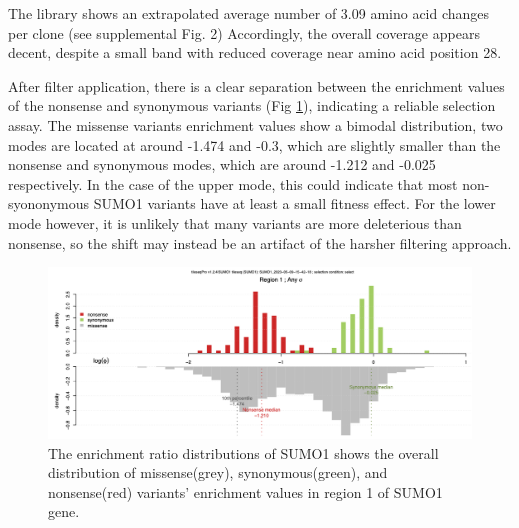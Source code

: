 \documentclass{article}
\begin{document}


The library shows an extrapolated average number of 3.09 amino acid changes per clone (see supplemental Fig. 2) Accordingly, the overall coverage appears decent, despite a small band with reduced coverage near amino acid position 28. 



After filter application, there is a clear separation between the enrichment values of the nonsense and synonymous variants (Fig \ref{fig:BCE distribution}), indicating a reliable selection assay.
The missense variants enrichment values show a bimodal distribution, two modes are located at around -1.474 and  -0.3, which are slightly smaller than the nonsense and synonymous modes, which are around -1.212 and -0.025 respectively. In the case of the upper mode, this could indicate that most non-syononymous SUMO1 variants have at least a small fitness effect. For the lower mode however, it is unlikely that many variants are more deleterious than nonsense, so the shift may instead be an artifact of the harsher filtering approach.
\begin{figure}[H]
    \centering
    \includegraphics[width =.7\textwidth]{Figures/SUMO1/BCE.png}
    \caption{The enrichment ratio distributions of SUMO1 shows the overall distribution of missense(grey), synonymous(green), and nonsense(red) variants' enrichment values in region 1 of SUMO1 gene. }
    \label{fig:BCE distribution}
\end{figure}
\end{document}
